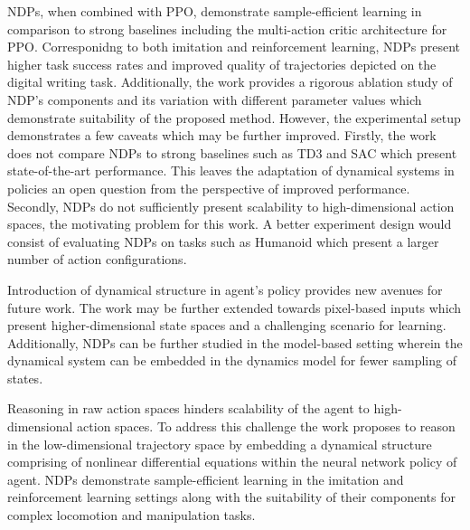 \documentclass[11pt,letterpaper]{article}
\begin{document}
NDPs, when combined with PPO, demonstrate sample-efficient learning in comparison to strong baselines including the multi-action critic architecture for PPO. Corresponidng to both imitation and reinforcement learning, NDPs present higher task success rates and improved quality of trajectories depicted on the digital writing task. Additionally, the work provides a rigorous ablation study of NDP's components and its variation with different parameter values which demonstrate suitability of the proposed method. However, the experimental setup demonstrates a few caveats which may be further improved. Firstly, the work does not compare NDPs to strong baselines such as TD3 and SAC which present state-of-the-art performance. This leaves the adaptation of dynamical systems in policies an open question from the perspective of improved performance. Secondly, NDPs do not sufficiently present scalability to high-dimensional action spaces, the motivating problem for this work. A better experiment design would consist of evaluating NDPs on tasks such as Humanoid which present a larger number of action configurations. 

Introduction of dynamical structure in agent's policy provides new avenues for future work. The work may be further extended towards pixel-based inputs which present higher-dimensional state spaces and a challenging scenario for learning. Additionally, NDPs can be further studied in the model-based setting wherein the dynamical system can be embedded in the dynamics model for fewer sampling of states. 

Reasoning in raw action spaces hinders scalability of the agent to high-dimensional action spaces. To address this challenge the work proposes to reason in the low-dimensional trajectory space by embedding a dynamical structure comprising of nonlinear differential equations within the neural network policy of agent. NDPs demonstrate sample-efficient learning in the imitation and reinforcement learning settings along with the suitability of their components for complex locomotion and manipulation tasks.
\end{document}
